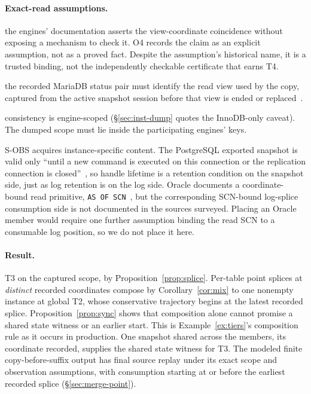 \documentclass[sigconf,nonacm,10pt]{acmart}
\theoremstyle{plain}
\theoremstyle{definition}
\begin{document}
\paragraph{Exact-read assumptions.}
\begin{description}
\RaggedRight
\item[\textbf{A-cert}] the engines' documentation asserts the
view-coordinate coincidence without exposing a mechanism to
check it. O4 records the claim as an explicit assumption, not as a
proved fact. Despite the assumption's historical name, it is a
trusted binding, not the independently checkable certificate that
earns T4.
\item[\textbf{A-scope}] the recorded MariaDB status pair must identify 
the read view used by the copy, captured from the active snapshot 
session before that view is ended or replaced~\cite{mariadb_binlog_status_vars,mariadb_snapshot_session_source}.

\item[\textbf{A-engine}, \textbf{A-engine-scope}] consistency is
engine-scoped (\S\ref{sec:inst-dump} quotes the InnoDB-only
caveat). The dumped scope must lie inside the participating
engines' keys.
\end{description}

S-OBS acquires instance-specific content. The PostgreSQL exported
snapshot is valid only ``until a new command is executed on this
connection or the replication connection is
closed''~\cite{postgres_protocol_replication}, so handle lifetime
is a retention condition on the snapshot side, just as log
retention is on the log side. Oracle documents a coordinate-bound
read primitive, \texttt{AS OF SCN}~\cite{oracle_flashback}, but
the corresponding SCN-bound log-splice consumption side is
not documented in the sources surveyed. Placing an Oracle member
would require one further assumption binding the read SCN to a
consumable log position, so we do not place it here.

\paragraph{Result.} T3 on the captured scope, by
Proposition~\ref{prop:splice}. Per-table point splices at
\emph{distinct} recorded coordinates compose by
Corollary~\ref{cor:mix} to one nonempty instance at global T2, whose
conservative trajectory begins at the latest recorded splice.
Proposition~\ref{prop:sync} shows that composition alone cannot promise
a shared state witness or an earlier start. This is
Example~\ref{ex:tiers}'s composition rule as it occurs in production. One
snapshot shared across the members, its coordinate recorded, supplies
the shared state witness for T3. The modeled finite copy-before-suffix output
has final source replay under its exact scope and observation assumptions,
with consumption starting at or before the earliest recorded splice
(\S\ref{sec:merge-point}).
\end{document}
